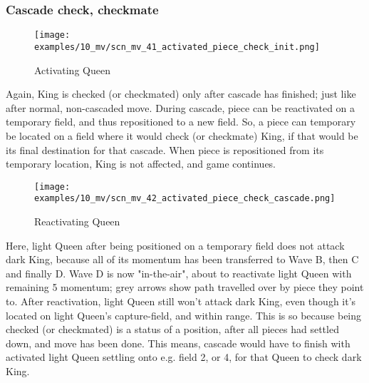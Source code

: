 \clearpage %

\subsubsection*{Cascade check, checkmate}
\label{sec:Miranda's veil/Wave/Cascading Waves/Cascade check, checkmate}

\vspace*{-1.4\baselineskip}
\noindent
\begin{figure}[!h]
\texttt{[image: examples/10\_mv/scn\_mv\_41\_activated\_piece\_check\_init.png]}
\caption{Activating Queen}
\label{fig:scn_mv_41_activated_piece_check_init}
\end{figure}

Again, King is checked (or checkmated) only after cascade has finished; just like
after normal, non-cascaded move. During cascade, piece can be reactivated on a
temporary field, and thus repositioned to a new field. So, a piece can temporary
be located on a field where it would check (or checkmate) King, if that would be
its final destination for that cascade. When piece is repositioned from its
temporary location, King is not affected, and game continues.

\clearpage %

\vspace*{-2.3\baselineskip}
\noindent
\begin{figure}[!h]
\texttt{[image: examples/10\_mv/scn\_mv\_42\_activated\_piece\_check\_cascade.png]}
\vspace*{-1.3\baselineskip}
\caption{Reactivating Queen}
\label{fig:scn_mv_42_activated_piece_check_cascade}
\end{figure}

\vspace*{-0.3\baselineskip}
Here, light Queen after being positioned on a temporary field does not attack dark
King, because all of its momentum has been transferred to Wave B, then C and finally
D. Wave D is now "in-the-air", about to reactivate light Queen with remaining 5
momentum; grey arrows show path travelled over by piece they point to. After
reactivation, light Queen still won't attack dark King, even though it's located on
light Queen's capture-field, and within range. This is so because being checked (or
checkmated) is a status of a position, after all pieces had settled down, and move
has been done. This means, cascade would have to finish with activated light Queen
settling onto e.g. field 2, or 4, for that Queen to check dark King.

